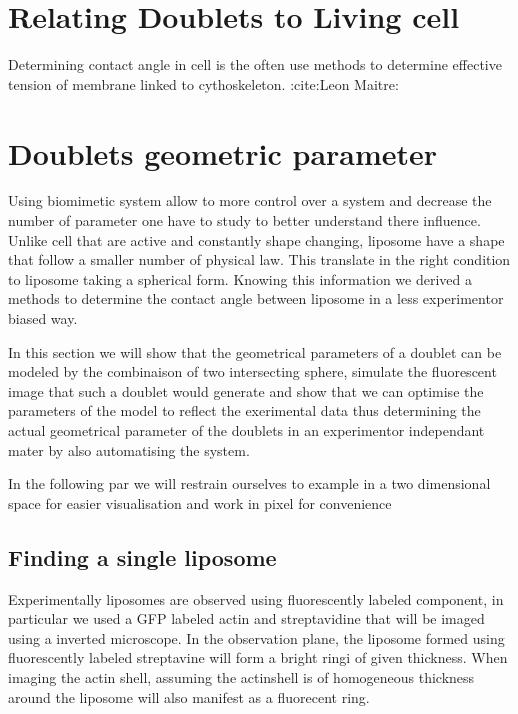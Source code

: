 \documentclass[A4paperpaper,11pt,english]{sphinxmanual}
\begin{document}
\section{Relating Doublets to Living cell}
\label{parts/physicalparameters:relating-doublets-to-living-cell}
Determining contact angle in cell is the often use methods to determine effective tension of membrane linked to cythoskeleton. :cite:Leon Maitre:


\section{Doublets geometric parameter}
\label{parts/physicalparameters:doublets-geometric-parameter}
Using biomimetic system allow to more control over a system and decrease the
number of parameter one have to study to better understand there influence.
Unlike cell that are active and constantly shape changing, liposome have a
shape that follow a smaller number of physical law. This translate in the right
condition to liposome taking a spherical form. Knowing this information we
derived a methods to determine the contact angle between liposome in a less
experimentor biased way.

In this section we will show that the geometrical parameters of a doublet can
be modeled by the combinaison of two intersecting sphere, simulate the
fluorescent image that such a doublet would generate  and show that we can
optimise the parameters of the model to reflect the exerimental data thus
determining the actual geometrical parameter of the doublets in an experimentor
independant mater by also automatising the system.

In the following par we will restrain ourselves to example in a two dimensional
space for easier visualisation and work in pixel for convenience


\subsection{Finding a single liposome}
\label{parts/physicalparameters:finding-a-single-liposome}
Experimentally liposomes are observed using fluorescently labeled component, in
particular we used a GFP labeled actin and streptavidine that will be imaged
using a inverted microscope. In the observation plane, the liposome formed
using fluorescently labeled streptavine will form a bright ringi of given
thickness.  When imaging the actin shell, assuming the actinshell is of
homogeneous thickness around the liposome will also manifest as a fluorecent ring.
\end{document}
